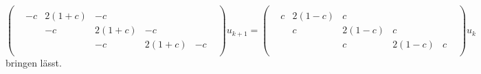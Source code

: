 \begin{equation}
\begin{pmatrix}
&      &        &        &        &        &        \\
&  -c  & 2(1+c) &  -c    &        &        &        \\
&      &  -c    & 2(1+c) &  -c    &        &        \\
&      &        &  -c    & 2(1+c) &  -c    &        \\
&      &        &        &        &        &        
\end{pmatrix}
u_{k+1}
=
\begin{pmatrix}
&      &        &        &        &        &        \\
&   c  & 2(1-c) &   c    &        &        &        \\
&      &   c    & 2(1-c) &   c    &        &        \\
&      &        &   c    & 2(1-c) &   c    &        \\
&      &        &        &        &        &        
\end{pmatrix}
u_k
\end{equation}
bringen lässt.

